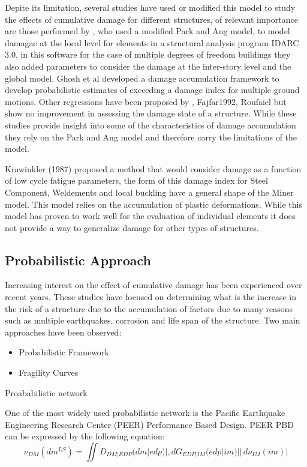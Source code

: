 Depite its limitation, several studies have used or modified this model to study the effects of cumulative damage for different structures,  of relevant importance are those performed by \cite{Kunnath1992}, who used a modified Park and Ang model, to model damagae at the local level for elements in a structural analysis program IDARC 3.0, in this software for the case of multiple degrees of freedom buildings they also added parameters to consider the damage at the inter-story level and the global model. Ghosh et al \cite{Ghosh2015} developed a damage accumulation framework to develop probabilistic estimates of exceeding a damage index for multiple ground motions. Other regressions have been proposed by \cite{Khashaee}, {Fajfar1992}, {Roufaiel} but show no improvement in assessing the damage state of a structure. While these studies provide insight into some of the characteristics of damage accumulation they rely on the Park and Ang model and therefore carry the limitations of the model.

Krawinkler (1987) \cite{Krawinkler1987} proposed a method that would consider damage as a function of low cycle fatigue parameters, the form of this damage index for Steel Component, Weldements and local buckling have a general shape of the Miner model. This model relies on the accumulation of plastic deformations. While this model has proven to work well for the evaluation of individual elements it does not provide a way to generalize damage for other types of structures.

\subsection{Probabilistic Approach}

Increasing interest on the effect of cumulative damage has been experienced over recent years. These studies have focused on determining what is the increase in the risk of a structure due to the accumulation of factors due to many reasons such as multiple earthquakes, corrosion and life span of the structure. Two main approaches have been observed:

\begin{itemize}
	\item Probabilistic Framework
	\item Fragility Curves
\end{itemize}

Proababilistic network

One of the most widely used probabilistic network is the Pacific Earthquake Engineering Research Center (PEER) Performance Based Design. PEER PBD can be expressed by the following equation:
\begin{equation}
\nu_{DM}(dm^{LS})=\iint D_{DM|EDP}(dm|edp)|,dG_{EDP|IM}(edp|im)||\,d\nu_{IM}(im)|
\end{equation}

